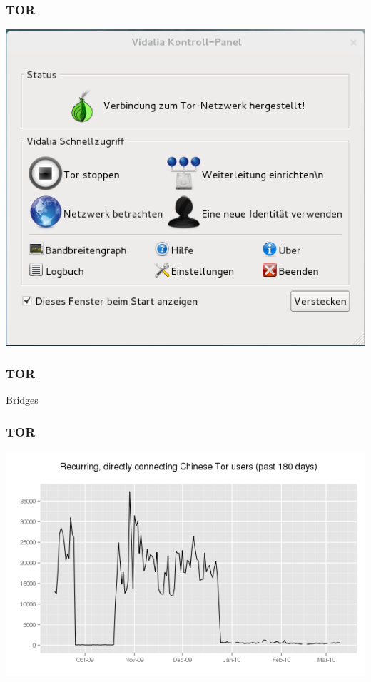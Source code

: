 \documentclass[12pt]{beamer}
\begin{document}
\begin{frame}
    \frametitle{TOR}
    \includegraphics[height=0.7\textheight]{img/vidalia.png}
\end{frame}

\begin{frame}
    \frametitle{TOR}
    \begin{center} \Large Bridges \end{center}
\end{frame}

\begin{frame}
    \frametitle{TOR}
    \includegraphics[height=0.7\textheight]{img/bridge1.png}
\end{frame}
\end{document}
